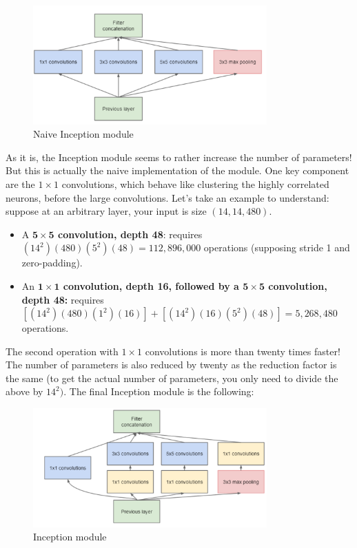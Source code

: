 \begin{figure}[H]
    \centering
    \includegraphics[width=0.8\textwidth]{Images/naiveinception.png}
    \caption{Naive Inception module \cite{googlenet}}
\end{figure}

As it is, the Inception module seems to rather increase the number of parameters! But this is actually the naive implementation of the module. One key component are the $1\times 1$ convolutions, which behave like clustering the highly correlated neurons, before the large convolutions. Let's take an example to understand: suppose at an arbitrary layer, your input is size $(14, 14, 480)$.
\begin{itemize}
\item A \textbf{$\mathbf{5\times 5}$ convolution, depth 48}: requires $(14^2)(480)(5^2)(48) = 112,896,000$ operations (supposing stride 1 and zero-padding).
\item An \textbf{$\mathbf{1\times 1}$ convolution, depth 16, followed by a $\mathbf{5\times 5}$ convolution, depth 48:} requires $[(14^2)(480)(1^2)(16)] + [(14^2)(16)(5^2)(48)] = 5,268,480$ operations.
\end{itemize}

The second operation with $1\times 1$ convolutions is more than twenty times faster! The number of parameters is also reduced by twenty as the reduction factor is the same (to get the actual number of parameters, you only need to divide the above by $14^2)$. The final Inception module is the following:

\begin{figure}[H]
    \centering
    \includegraphics[width=0.8\textwidth]{Images/inception.png}
    \caption{Inception module \cite{googlenet}}
\end{figure}

